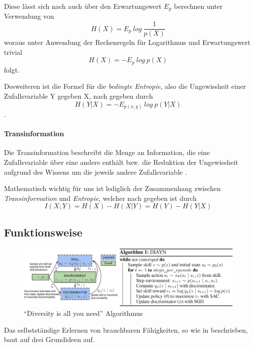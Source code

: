 Diese lässt sich nach \cite{elements_cover} auch über den Erwartungswert $ E_p $ berechnen unter Verwendung von
\begin{equation*}
    H(X) = E_p\ log\ \frac{1}{p(X)} \label{eq:entropy_1}
\end{equation*}
woraus unter Anwendung der Rechenregeln für Logarithmus und Erwartungswert trivial
\begin{equation}
    H(X) = - E_p\ log\ p(X) \label{eq:entropy_2}
\end{equation}
folgt.

Desweiteren ist die Formel für die \textit{bedingte Entropie}, also die Ungewissheit einer Zufallsvariable Y gegeben X, nach \cite{elements_cover} gegeben durch
\begin{equation}
    H(Y|X) = - E_{p(x,y)}\ log\ p(Y|X) \label{eq:condit_entropy}
\end{equation}
.

\paragraph{Transinformation}

Die Transinformation beschreibt die Menge an Information, die eine Zufallsvariable über eine andere enthält bzw. die Reduktion der Ungewissheit aufgrund des Wissens um die jeweils andere Zufallsvariable \cite{elements_cover}.

Mathematisch wichtig für uns ist lediglich der Zusammenhang zwischen \textit{Transinformation} und \textit{Entropie}, welcher nach \cite{elements_cover} gegeben ist durch
\begin{equation}
    I(X;Y) = H(X) - H(X|Y) = H(Y) - H(Y|X) \label{eq:trans_ent}
\end{equation}

\subsection{Funktionsweise}
\label{sec:diversity_howitworks}
\begin{figure}[h]
\includegraphics[width=\textwidth, keepaspectratio=true]{images/algorithm_diayn.JPG}
\caption{``Diversity is all you need'' Algorithmus} \label{img:diayn}
\end{figure}
Das selbstständige Erlernen von brauchbaren Fähigkeiten, so wie in \cite{diversity_eysenbach} beschrieben, baut auf drei Grundideen auf.

